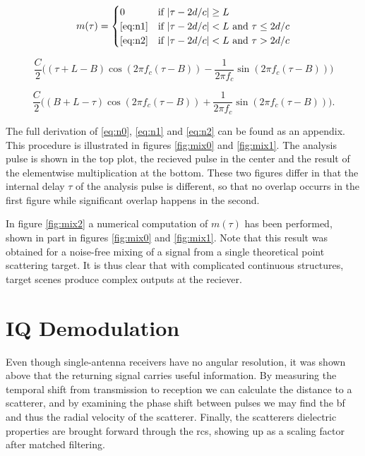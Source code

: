 \begin{equation}\label{eq:n0}
	m(\tau) = 
	\begin{cases}
		0 & \text{if $|\tau-2d/c|\geq L$} \\
		\text{\eqref{eq:n1}} & \text{if $|\tau-2d/c|<L$ and $\tau \leq 2d/c$} \\
		\text{\eqref{eq:n2}} & \text{if $|\tau-2d/c|<L$ and $\tau > 2d/c$}
	\end{cases}
\end{equation}

\begin{equation}\label{eq:n1}
	\frac{C}{2}\Big((\tau + L - B)\cos(2\pi f_c(\tau - B)) 
	- \frac{1}{2\pi f_c}\sin(2\pi f_c(\tau - B))\Big)
\end{equation}

\begin{equation}\label{eq:n2}
	\frac{C}{2}\Big((B + L - \tau)\cos(2\pi f_c(\tau - B)) 
	+ \frac{1}{2\pi f_c}\sin(2\pi f_c(\tau - B))\Big).
\end{equation}

The full derivation of \eqref{eq:n0}, \eqref{eq:n1} and \eqref{eq:n2} can be found as an appendix. This procedure is illustrated in figures \ref{fig:mix0} and \ref{fig:mix1}. The analysis pulse is shown in the top plot, the recieved pulse in the center and the result of the elementwise multiplication at the bottom. These two figures differ in that the internal delay $\tau$ of the analysis pulse is different, so that no overlap occurrs in the first figure while significant overlap happens in the second.

In figure \ref{fig:mix2} a numerical computation of $m(\tau)$ has been performed, shown in part in figures \ref{fig:mix0} and \ref{fig:mix1}. Note that this result was obtained for a noise-free mixing of a signal from a single theoretical point scattering target. It is thus clear that with complicated continuous structures, target scenes produce complex outputs at the reciever.

\section{IQ Demodulation}
\label{sec:iq}

Even though single-antenna receivers have no angular resolution, it was shown above that the returning signal carries useful information. By measuring the temporal shift from transmission to reception we can calculate the distance to a scatterer, and by examining the phase shift between pulses we may find the \gls{bf} and thus the radial velocity of the scatterer. Finally, the scatterers dielectric properties are brought forward through the \gls{rcs}, showing up as a scaling factor after matched filtering. 

